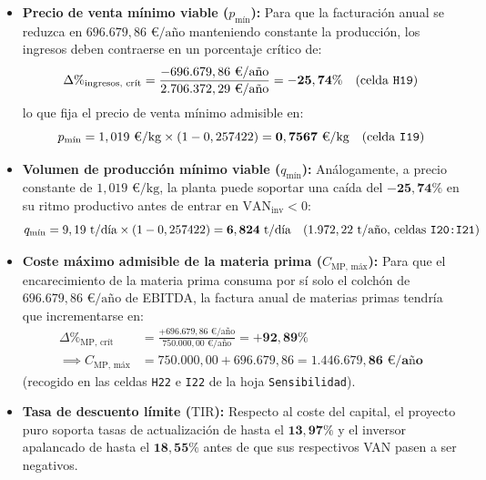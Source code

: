 \documentclass[a4paper,11pt]{report}
\providecommand{\euro}{€}
\begin{document}
\begin{itemize}
    \item \textbf{Precio de venta mínimo viable ($p_{\text{mín}}$):} Para que la facturación anual se reduzca en $696.679,86\text{ \euro/año}$ manteniendo constante la producción, los ingresos deben contraerse en un porcentaje crítico de:
    \begin{equation}
        \Delta\%_{\text{ingresos, crít}} = \frac{-696.679,86\text{ \euro/año}}{2.706.372,29\text{ \euro/año}} = \mathbf{-25,74\%} \quad (\text{celda \texttt{H19}})
    \end{equation}
    lo que fija el precio de venta mínimo admisible en:
    \begin{equation}
        p_{\text{mín}} = 1,019\text{ \euro/kg} \times (1 - 0,257422) = \mathbf{0,7567\text{ \euro/kg}} \quad (\text{celda \texttt{I19}})
    \end{equation}
    \item \textbf{Volumen de producción mínimo viable ($q_{\text{mín}}$):} Análogamente, a precio constante de $1,019\text{ \euro/kg}$, la planta puede soportar una caída del $\mathbf{-25,74\%}$ en su ritmo productivo antes de entrar en $\text{VAN}_{\text{inv}} < 0$:
    \begin{equation}
        q_{\text{mín}} = 9,19\text{ t/día} \times (1 - 0,257422) = \mathbf{6,824\text{ t/día}} \quad (1.972,22\text{ t/año, celdas \texttt{I20:I21}})
    \end{equation}
    \item \textbf{Coste máximo admisible de la materia prima ($C_{\text{MP, máx}}$):} Para que el encarecimiento de la materia prima consuma por sí solo el colchón de $696.679,86\text{ \euro/año}$ de EBITDA, la factura anual de materias primas tendría que incrementarse en:
    \begin{equation}
    \begin{aligned}
        \Delta\%_{\text{MP, crít}} &= \frac{+696.679,86\text{ \euro/año}}{750.000,00\text{ \euro/año}} = \mathbf{+92,89\%} \\
        \implies C_{\text{MP, máx}} &= 750.000,00 + 696.679,86 = \mathbf{1.446.679,86\text{ \euro/año}}
    \end{aligned}
    \end{equation}
    (recogido en las celdas \texttt{H22} e \texttt{I22} de la hoja \texttt{Sensibilidad}).
    \item \textbf{Tasa de descuento límite ($\text{TIR}$):} Respecto al coste del capital, el proyecto puro soporta tasas de actualización de hasta el $\mathbf{13,97\%}$ y el inversor apalancado de hasta el $\mathbf{18,55\%}$ antes de que sus respectivos VAN pasen a ser negativos.
\end{itemize}
\end{document}
